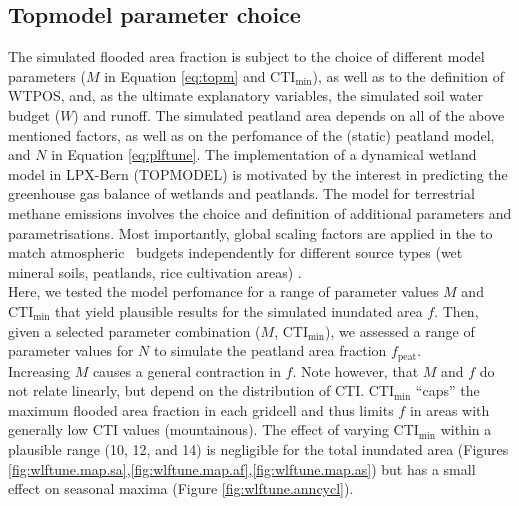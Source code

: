 \subsection{Topmodel parameter choice}
\label{sec:params}
The simulated flooded area fraction is subject to the choice of different model parameters ($M$ in Equation \ref{eq:topm} and CTI$_{\text{min}}$), as well as to the definition of WTPOS, and, as the ultimate explanatory variables, the simulated soil water budget ($W$) and runoff. The simulated peatland area depends on all of the above mentioned factors, as well as on the perfomance of the (static) peatland model, and $N$ in Equation \ref{eq:plftune}. The implementation of a dynamical wetland model in LPX-Bern (TOPMODEL) is motivated by the interest in predicting the greenhouse gas balance of wetlands and peatlands. The model for terrestrial methane emissions involves the choice and definition of additional parameters and parametrisations. Most importantly, global scaling factors are applied in the to match atmospheric \chh\ budgets independently for different source types (wet mineral soils, peatlands, rice cultivation areas) \citep{spahni11bg}.\\

Here, we tested the model perfomance for a range of parameter values $M$ and CTI$_{\text{min}}$ that yield plausible results for the simulated inundated area $f$. Then, given a selected parameter combination ($M$, CTI$_{\text{min}}$), we assessed a range of parameter values for $N$ to simulate the peatland area fraction $f_{\text{peat}}$.\\

 Increasing $M$ causes a general contraction in $f$. Note however, that $M$ and $f$ do not relate linearly, but depend on the distribution of CTI. CTI$_{\text{min}}$ ``caps'' the maximum flooded area fraction in each gridcell and thus limits $f$ in areas with generally low CTI values (mountainous). The effect of varying CTI$_{\text{min}}$ within a plausible range (10, 12, and 14) is negligible for the total inundated area (Figures \ref{fig:wlftune.map.sa},\ref{fig:wlftune.map.af},\ref{fig:wlftune.map.as}) but has a small effect on seasonal maxima (Figure \ref{fig:wlftune.anncycl}).\\

